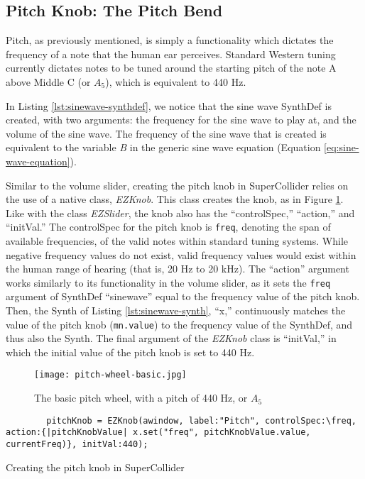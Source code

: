\subsection{Pitch Knob: The Pitch Bend}

Pitch, as previously mentioned, is simply a functionality which dictates the frequency of a note that the human ear perceives. Standard Western tuning currently dictates notes to be tuned around the starting pitch of the note A above Middle C (or $A_5$), which is equivalent to 440 Hz.

In Listing \ref{lst:sinewave-synthdef}, we notice that the sine wave SynthDef is created, with two arguments: the frequency for the sine wave to play at, and the volume of the sine wave. The frequency of the sine wave that is created is equivalent to the variable \textit{B} in the generic sine wave equation (Equation \ref{eq:sine-wave-equation}).

Similar to the volume slider, creating the pitch knob in SuperCollider relies on the use of a native class, \textit{EZKnob}. This class creates the knob, as in Figure \ref{fig:pitch-wheel-basic}. Like with the class \textit{EZSlider}, the knob also has the ``controlSpec,'' ``action,'' and ``initVal.'' The controlSpec for the pitch knob is \texttt{freq}, denoting the span of available frequencies, of the valid notes within standard tuning systems. While negative frequency values do not exist, valid frequency values would exist within the human range of hearing (that is, 20 Hz to 20 kHz). The ``action'' argument works similarly to its functionality in the volume slider, as it sets the \texttt{freq} argument of SynthDef ``sinewave'' equal to the frequency value of the pitch knob. Then, the Synth of Listing \ref{lst:sinewave-synth}, ``x,'' continuously matches the value of the pitch knob (\texttt{mn.value}) to the frequency value of the SynthDef, and thus also the Synth. The final argument of the \textit{EZKnob} class is ``initVal,'' in which the initial value of the pitch knob is set to 440 Hz.

\begin{figure}
  \centering
  \texttt{[image: pitch-wheel-basic.jpg]}
  \caption{The basic pitch wheel, with a pitch of 440 Hz, or $A_5$}
  \label{fig:pitch-wheel-basic}
\end{figure}

\begin{listing}
	\begin{lstlisting}
		pitchKnob = EZKnob(awindow, label:"Pitch", controlSpec:\freq, action:{|pitchKnobValue| x.set("freq", pitchKnobValue.value, currentFreq)}, initVal:440);
	\end{lstlisting}
	\caption{Creating the pitch knob in SuperCollider}
	\label{lst:pitch-knob-waveform}
\end{listing}



